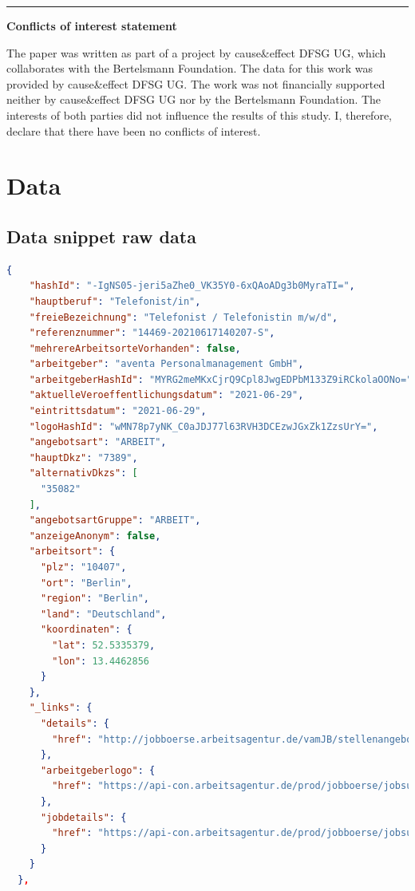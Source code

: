 \documentclass[12pt, a4paper, titlepage]{article}
\begin{document}
\noindent\rule[0.5ex]{\linewidth}{1pt}

\noindent \small{\textbf{Conflicts of interest statement}}

\bigskip

\noindent \footnotesize{The paper was written as part of a project by cause\&effect DFSG UG, which collaborates with the Bertelsmann Foundation. The data for this work was provided by cause\&effect DFSG UG. The work was not financially supported neither by cause\&effect DFSG UG nor by the Bertelsmann Foundation. The interests of both parties did not influence the results of this study. I, therefore, declare that there have been no conflicts of interest.}


\clearpage





\newpage
\appendix
\section{Data}
\subsection{Data snippet raw data}
\begin{lstlisting}[language=json]
  {
    "hashId": "-IgNS05-jeri5aZhe0_VK35Y0-6xQAoADg3b0MyraTI=",
    "hauptberuf": "Telefonist/in",
    "freieBezeichnung": "Telefonist / Telefonistin m/w/d",
    "referenznummer": "14469-20210617140207-S",
    "mehrereArbeitsorteVorhanden": false,
    "arbeitgeber": "aventa Personalmanagement GmbH",
    "arbeitgeberHashId": "MYRG2meMKxCjrQ9Cpl8JwgEDPbM133Z9iRCkolaOONo=",
    "aktuelleVeroeffentlichungsdatum": "2021-06-29",
    "eintrittsdatum": "2021-06-29",
    "logoHashId": "wMN78p7yNK_C0aJDJ77l63RVH3DCEzwJGxZk1ZzsUrY=",
    "angebotsart": "ARBEIT",
    "hauptDkz": "7389",
    "alternativDkzs": [
      "35082"
    ],
    "angebotsartGruppe": "ARBEIT",
    "anzeigeAnonym": false,
    "arbeitsort": {
      "plz": "10407",
      "ort": "Berlin",
      "region": "Berlin",
      "land": "Deutschland",
      "koordinaten": {
        "lat": 52.5335379,
        "lon": 13.4462856
      }
    },
    "_links": {
      "details": {
        "href": "http://jobboerse.arbeitsagentur.de/vamJB/stellenangebotAnzeigen.html?bencs=xZ8NQKDByg2g6avJgLLIrGwqlXZQi1GKNAI%2BzAoCWJ5RD6egZDnwqMFj%2B4AnUX6XN5nyEJ7NKSdBBr1EvlmnVw%3D%3D"
      },
      "arbeitgeberlogo": {
        "href": "https://api-con.arbeitsagentur.de/prod/jobboerse/jobsuche-service/ed/v1/arbeitgeberlogo/wMN78p7yNK_C0aJDJ77l63RVH3DCEzwJGxZk1ZzsUrY="
      },
      "jobdetails": {
        "href": "https://api-con.arbeitsagentur.de/prod/jobboerse/jobsuche-service/pc/v1/jobdetails/-IgNS05-jeri5aZhe0_VK35Y0-6xQAoADg3b0MyraTI="
      }
    }
  },
\end{lstlisting}
\end{document}
